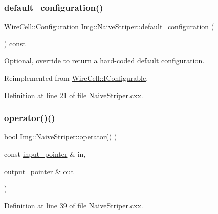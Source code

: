 \subsubsection{\texorpdfstring{default\+\_\+configuration()}{default\_configuration()}}
{\footnotesize\ttfamily \hyperlink{namespace_wire_cell_a9f705541fc1d46c608b3d32c182333ee}{Wire\+Cell\+::\+Configuration} Img\+::\+Naive\+Striper\+::default\+\_\+configuration (\begin{DoxyParamCaption}{ }\end{DoxyParamCaption}) const\hspace{0.3cm}{\ttfamily [virtual]}}



Optional, override to return a hard-\/coded default configuration. 



Reimplemented from \hyperlink{class_wire_cell_1_1_i_configurable_a54841b2da3d1ea02189478bff96f7998}{Wire\+Cell\+::\+I\+Configurable}.



Definition at line 21 of file Naive\+Striper.\+cxx.

\mbox{\label{class_wire_cell_1_1_img_1_1_naive_striper_a568d56d13dbba3a4351f0ef9f2df43f3}} 
\subsubsection{\texorpdfstring{operator()()}{operator()()}}
{\footnotesize\ttfamily bool Img\+::\+Naive\+Striper\+::operator() (\begin{DoxyParamCaption}\item[{const \hyperlink{class_wire_cell_1_1_i_function_node_a55c0946156df9b712b8ad1a0b59b2db6}{input\+\_\+pointer} \&}]{in,  }\item[{\hyperlink{class_wire_cell_1_1_i_function_node_afc02f1ec60d31aacddf64963f9ca650b}{output\+\_\+pointer} \&}]{out }\end{DoxyParamCaption})\hspace{0.3cm}{\ttfamily [virtual]}}



Definition at line 39 of file Naive\+Striper.\+cxx.


